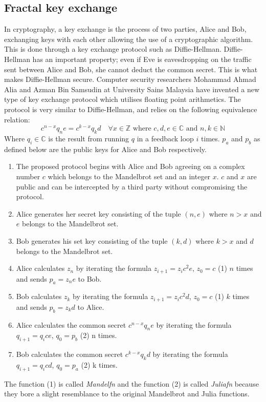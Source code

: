 \documentclass{article}
\begin{document}
\subsection{Fractal key exchange}
In cryptography, a key exchange is the process of two parties, Alice and Bob, exchanging keys with each other allowing the use of a cryptographic algorithm. This is done through a key exchange protocol such as Diffie-Hellman. Diffie-Hellman has an important property; even if Eve is eavesdropping on the traffic sent between Alice and Bob, she cannot deduct the common secret. This is what makes Diffie-Hellman secure. Computer security researchers Mohammad Ahmad Alia and Azman Bin Samsudin at University Sains Malaysia have invented a new type of key exchange protocol which utilises floating point arithmetics\cite{alia&samsudin}. The protocol is very similar to Diffie-Hellman, and relies on the following equivalence relation:
\[
c^{n-x}q_{n}e=c^{k-x}q_{k}d\quad \forall x\in \mathbb{Z} 
\text{ where } c, d, e\in \mathbb{C} \text{ and }
n, k\in \mathbb{N}
\]
Where $q_{i}\in \mathbb{C}$ is the result from running  $q$ in a feedback loop $i$ times. $p_{a}$ and $p_{b}$ as defined below are the public keys for Alice and Bob respectively.
\begin{enumerate}
  \item The proposed protocol begins with Alice and Bob agreeing on a complex number $c$ which belongs to the Mandelbrot set and an integer $x$. $c$ and $x$ are public and can be intercepted by a third party without compromising the protocol.
  \item Alice generates her secret key consisting of the tuple $(n, e)$ where $n>x$ and $e$ belongs to the Mandelbrot set.
  \item Bob generates his set key consisting of the tuple $(k, d)$ where $k>x$ and $d$ belongs to the Mandelbrot set.
  \item Alice calculates $z_{n}$ by iterating the formula $z_{i+1}=z_{i}c^2e$, $z_{0}=c$ (1) $n$ times and sends $p_{a}=z_{n}e$ to Bob.
  \item Bob calculates $z_{k}$ by iterating the formula $z_{i+1}=z_{i}c^2d$, $z_{0}=c$ (1) $k$ times and sends $p_{b}=z_{k}d$ to Alice.
  \item Alice calculates the common secret $c^{n-x}q_{n}e$ by iterating the formula $q_{i+1}=q_{i}ce$, $q_{0}=p_{b}$ (2) n times.
  \item Bob calculates the common secret $c^{k-x}q_{k}d$ by iterating the formula $q_{i+1}=q_{i}cd$, $q_{0}=p_{a}$ (2) k times.
\end{enumerate}
The function (1) is called \textit{Mandelfn} and the function (2) is called \textit{Juliafn} because they bore a slight resemblance to the original Mandelbrot and Julia functions.
\end{document}
